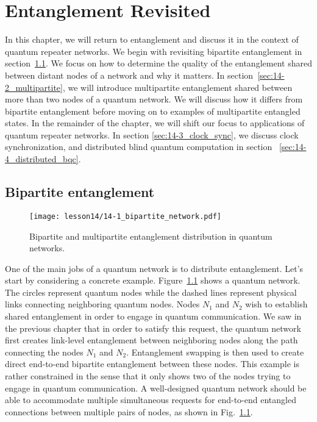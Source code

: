 \chapter{Entanglement Revisited}

In this chapter, we will return to entanglement and discuss it in the context of quantum repeater networks.
We begin with revisiting bipartite entanglement in section~\ref{sec:14-1_bipartite}.
We focus on how to determine the quality of the entanglement shared between distant nodes of a network and why it matters.
In section~\ref{sec:14-2_multipartite}, we will introduce multipartite entanglement shared between more than two nodes of a quantum network.
We will discuss how it differs from bipartite entanglement before moving on to examples of multipartite entangled states.
In the remainder of the chapter, we will shift our focus to applications of quantum repeater networks.
In section \ref{sec:14-3_clock_sync}, we discuss clock synchronization, and distributed blind quantum computation in section ~\ref{sec:14-4_distributed_bqc}.



\section{Bipartite entanglement}
\label{sec:14-1_bipartite}

\begin{figure}[t]
    \centering
    \texttt{[image: lesson14/14-1\_bipartite\_network.pdf]}
    \caption[Bipartite and multipartite entanglement.]{Bipartite and multipartite entanglement distribution in quantum networks.}
    \label{fig:14-1_bipartite_multipartite}
\end{figure}

One of the main jobs of a quantum network is to distribute entanglement.
Let's start by considering a concrete example.
Figure~\ref{fig:14-1_bipartite_multipartite} shows a quantum network.
The circles represent quantum nodes while the dashed lines represent physical links connecting neighboring quantum nodes.
Nodes $N_1$ and $N_2$ wish to establish shared entanglement in order to engage in quantum communication.
We saw in the previous chapter that in order to satisfy this request, the quantum network first creates link-level entanglement between neighboring nodes along the path connecting the nodes $N_1$ and $N_2$.
Entanglement swapping is then used to create direct end-to-end bipartite entanglement between these nodes.
This example is rather constrained in the sense that it only shows two of the nodes trying to engage in quantum communication.
A well-designed quantum network should be able to accommodate multiple simultaneous requests for end-to-end entangled connections between multiple pairs of nodes, as shown in Fig.~\ref{fig:14-1_bipartite_multipartite}. 

